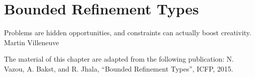 \chapter{Bounded Refinement Types}\label{boundedrefinements}


\makequote
{Problems are hidden opportunities, and constraints can actually boost creativity.}
{Martin Villeneuve}

\begin{comment}
\makequote
{The more constraints one imposes, the more one frees one's self. \\
And the arbitrariness of the constraint serves only to obtain precision of execution.}
{Igor Stravinsky}
\end{comment}









The material of this chapter are adapted from the following publication:
\noindent N. Vazou, A. Bakst, and R. Jhala,
``Bounded Refinement Types'',
ICFP, 2015.
